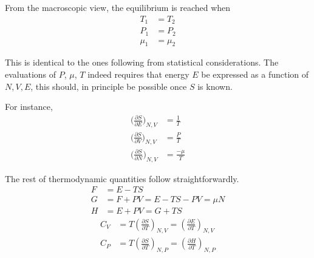 From the macroscopic view, the equilibrium is reached when
\begin{equation} 
	\begin{split}
	T_1 &= T_2 \\
	P_1 &= P_2 \\
	\mu_1 &= \mu_2 
	\end{split}
\end{equation}

This is identical to the ones following from statistical considerations.
The evaluations of $P$, $\mu$, $T$ indeed requires that energy $E$ be expressed as a function of $N,V,E$,
this should, in principle be possible once $S$ is known.

For instance,
\begin{equation} 
	\begin{split}
		\bigg(\frac{\partial S}{\partial E}\bigg)_{N,V} &= \frac{1}{T} \\
		\bigg(\frac{\partial S}{\partial V}\bigg)_{N,V} &= \frac{P}{T} \\
		\bigg(\frac{\partial S}{\partial N}\bigg)_{N,V} &= \frac{-\mu}{T} 
	\end{split}
\end{equation}


The rest of thermodynamic quantities follow straightforwardly.
\begin{equation}
	\begin{split}
		F &= E - TS \\
		G &= F + PV = E - TS - PV = \mu N \\
		H &= E + PV = G + TS
	\end{split}
\end{equation}
\begin{equation}
	\begin{split}
		C_V &= T(\frac{\partial S}{\partial T})_{N,V} = (\frac{\partial E}{\partial T})_{N,V}\\
		C_P &= T(\frac{\partial S}{\partial T})_{N,P} = (\frac{\partial H}{\partial T})_{N,P}
	\end{split}
\end{equation}


